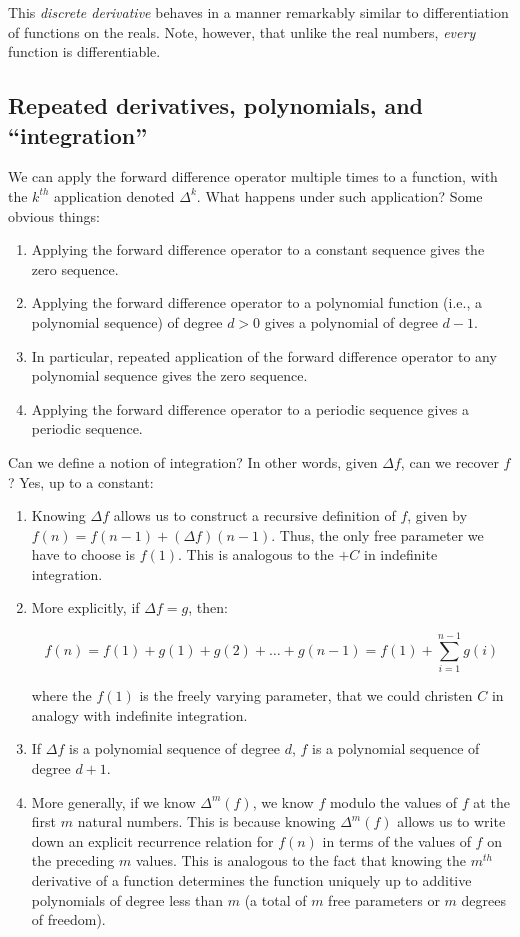 \documentclass{amsart}
\begin{document}
This {\em discrete derivative} behaves in a manner remarkably similar
to differentiation of functions on the reals. Note, however, that
unlike the real numbers, {\em every} function is differentiable.

\subsection{Repeated derivatives, polynomials, and ``integration''}

We can apply the forward difference operator multiple times to a
function, with the $k^{th}$ application denoted $\Delta^k$. What
happens under such application? Some obvious things:

\begin{enumerate}
\item Applying the forward difference operator to a constant sequence
gives the zero sequence.
\item Applying the forward difference operator to a polynomial
  function (i.e., a polynomial sequence) of degree $d > 0$ gives a
  polynomial of degree $d - 1$.
\item In particular, repeated application of the forward difference
  operator to any polynomial sequence gives the zero sequence.
\item Applying the forward difference operator to a periodic sequence
  gives a periodic sequence.
\end{enumerate}

Can we define a notion of integration? In other words, given $\Delta
f$, can we recover $f$? Yes, up to a constant:

\begin{enumerate}
\item Knowing $\Delta f$ allows us to construct a recursive definition
  of $f$, given by $f(n) = f(n - 1) + (\Delta f)(n - 1)$. Thus, the
  only free parameter we have to choose is $f(1)$. This is analogous
  to the $+C$ in indefinite integration.
\item More explicitly, if $\Delta f = g$, then:

  $$f(n) = f(1) + g(1) + g(2) + \dots + g(n - 1) = f(1) + \sum_{i=1}^{n-1} g(i)$$

  where the $f(1)$ is the freely varying parameter, that we could
  christen $C$ in analogy with indefinite integration.
\item If $\Delta f$ is a polynomial sequence of degree $d$, $f$ is a
  polynomial sequence of degree $d + 1$.
\item More generally, if we know $\Delta^m (f)$, we know $f$ modulo
  the values of $f$ at the first $m$ natural numbers. This is because
  knowing $\Delta^m(f)$ allows us to write down an explicit recurrence
  relation for $f(n)$ in terms of the values of $f$ on the preceding
  $m$ values. This is analogous to the fact that knowing the $m^{th}$
  derivative of a function determines the function uniquely up to
  additive polynomials of degree less than $m$ (a total of $m$ free
  parameters or $m$ degrees of freedom).
\end{enumerate}
\end{document}
